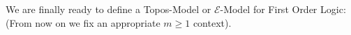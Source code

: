 %
%
\newpage
We are finally ready to define a Topos-Model or $\mathcal{E}$-Model for First Order Logic:
(From now on we fix an appropriate $m \geq 1$ context).

